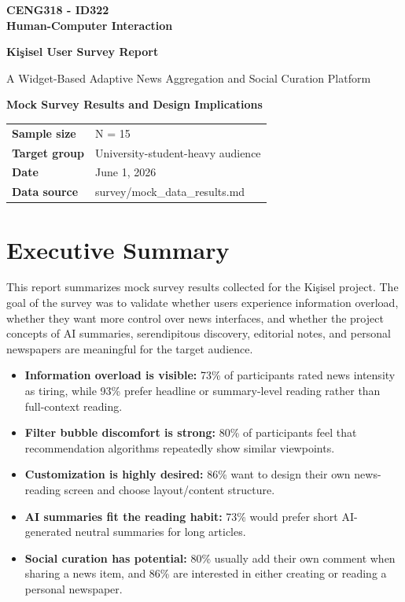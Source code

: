 \documentclass[12pt,a4paper]{article}
\newcommand{\insight}[2]{%
  \textbf{#1:} #2
}
\begin{document}
\begin{titlepage}
  \centering
  \vspace*{1.4cm}

  {\Large\bfseries CENG318 - ID322\\ Human-Computer Interaction\par}
  \vspace{1.2cm}
  {\huge\bfseries Kişisel User Survey Report\par}
  \vspace{0.35cm}
  {\Large A Widget-Based Adaptive News Aggregation and Social Curation Platform\par}
  \vspace{1cm}
  {\large\bfseries Mock Survey Results and Design Implications\par}

  \vfill

  \begin{tabular}{@{}ll@{}}
    \textbf{Sample size} & N = 15 \\
    \textbf{Target group} & University-student-heavy audience \\
    \textbf{Date} & June 1, 2026 \\
    \textbf{Data source} & survey/mock\_data\_results.md \\
  \end{tabular}
\end{titlepage}

\section*{Executive Summary}

This report summarizes mock survey results collected for the Kişisel project. The goal of the survey was to validate whether users experience information overload, whether they want more control over news interfaces, and whether the project concepts of AI summaries, serendipitous discovery, editorial notes, and personal newspapers are meaningful for the target audience.

\begin{itemize}[leftmargin=1.2cm, itemsep=0.25em]
  \item \insight{Information overload is visible}{73\% of participants rated news intensity as tiring, while 93\% prefer headline or summary-level reading rather than full-context reading.}
  \item \insight{Filter bubble discomfort is strong}{80\% of participants feel that recommendation algorithms repeatedly show similar viewpoints.}
  \item \insight{Customization is highly desired}{86\% want to design their own news-reading screen and choose layout/content structure.}
  \item \insight{AI summaries fit the reading habit}{73\% would prefer short AI-generated neutral summaries for long articles.}
  \item \insight{Social curation has potential}{80\% usually add their own comment when sharing a news item, and 86\% are interested in either creating or reading a personal newspaper.}
\end{itemize}
\end{document}
